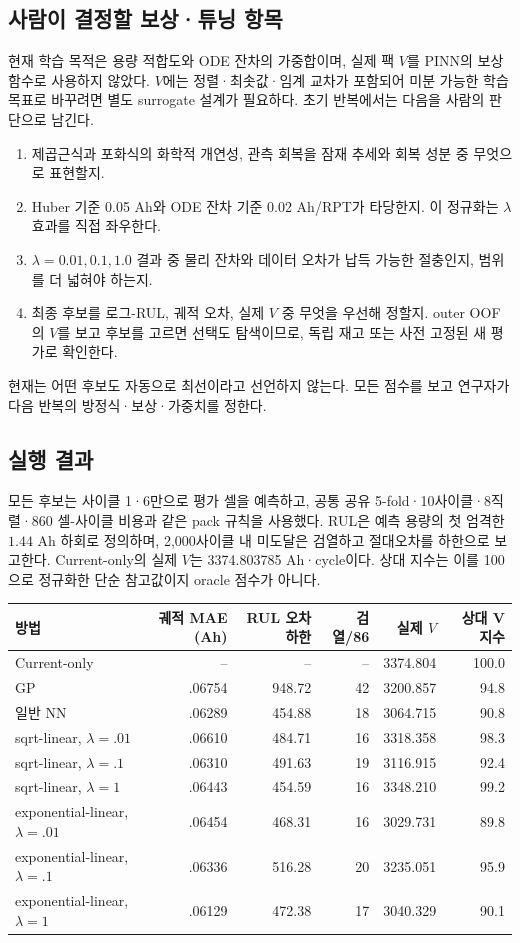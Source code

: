 \subsection*{사람이 결정할 보상·튜닝 항목}
현재 학습 목적은 용량 적합도와 ODE 잔차의 가중합이며, 실제 팩 $V$를 PINN의 보상함수로 사용하지 않았다. $V$에는 정렬·최솟값·임계 교차가 포함되어 미분 가능한 학습목표로 바꾸려면 별도 surrogate 설계가 필요하다. 초기 반복에서는 다음을 사람의 판단으로 남긴다.
\begin{enumerate}
\item 제곱근식과 포화식의 화학적 개연성, 관측 회복을 잠재 추세와 회복 성분 중 무엇으로 표현할지.
\item Huber 기준 0.05 Ah와 ODE 잔차 기준 0.02 Ah/RPT가 타당한지. 이 정규화는 $\lambda$ 효과를 직접 좌우한다.
\item $\lambda=0.01,0.1,1.0$ 결과 중 물리 잔차와 데이터 오차가 납득 가능한 절충인지, 범위를 더 넓혀야 하는지.
\item 최종 후보를 로그-RUL, 궤적 오차, 실제 $V$ 중 무엇을 우선해 정할지. outer OOF의 $V$를 보고 후보를 고르면 선택도 탐색이므로, 독립 재고 또는 사전 고정된 새 평가로 확인한다.
\end{enumerate}
현재는 어떤 후보도 자동으로 최선이라고 선언하지 않는다. 모든 점수를 보고 연구자가 다음 반복의 방정식·보상·가중치를 정한다.

\subsection*{실행 결과}
모든 후보는 사이클 1·6만으로 평가 셀을 예측하고, 공통 공유 5-fold·10사이클·8직렬·860 셀-사이클 비용과 같은 pack 규칙을 사용했다. RUL은 예측 용량의 첫 엄격한 $1.44$ Ah 하회로 정의하며, 2,000사이클 내 미도달은 검열하고 절대오차를 하한으로 보고한다. Current-only의 실제 $V$는 3374.803785 Ah·cycle이다. 상대 지수는 이를 100으로 정규화한 단순 참고값이지 oracle 점수가 아니다.

\begin{center}
\begin{tabular}{lrrrrr}
\toprule
방법 & 궤적 MAE (Ah) & RUL 오차 하한 & 검열/86 & 실제 $V$ & 상대 V 지수 \\
\midrule
Current-only & -- & -- & -- & 3374.804 & 100.0 \\
GP & .06754 & 948.72 & 42 & 3200.857 & 94.8 \\
일반 NN & .06289 & 454.88 & 18 & 3064.715 & 90.8 \\
sqrt-linear, $\lambda=.01$ & .06610 & 484.71 & 16 & 3318.358 & 98.3 \\
sqrt-linear, $\lambda=.1$ & .06310 & 491.63 & 19 & 3116.915 & 92.4 \\
sqrt-linear, $\lambda=1$ & .06443 & 454.59 & 16 & 3348.210 & 99.2 \\
exponential-linear, $\lambda=.01$ & .06454 & 468.31 & 16 & 3029.731 & 89.8 \\
exponential-linear, $\lambda=.1$ & .06336 & 516.28 & 20 & 3235.051 & 95.9 \\
exponential-linear, $\lambda=1$ & .06129 & 472.38 & 17 & 3040.329 & 90.1 \\
\bottomrule
\end{tabular}
\end{center}

